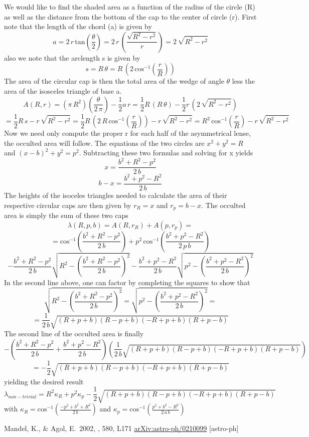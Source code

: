 \documentclass[12pt,preprint]{aastex}
\begin{document}
%

We would like to find the shaded area as a function of the radius of the circle (R)
as well as the distance from the bottom of the cap to the center of circle (r).
First note that the length of the chord (a) is given by
\[
a = 2 \, r \, \mathrm{tan} \left( \frac{\theta}{2} \right) = 2 \, r \,
\left( \frac{\sqrt{R^2 - r^2}}{r} \right) = 2 \, \sqrt{R^2 - r^2}
\]
also we note that the arclength s is given by
\[
s = R \, \theta = R \, \left( 2 \, \mathrm{cos}^{-1} \left( \frac{r}{R} \right) \right)
\]
The area of the circular cap is then the total area of the wedge of angle $\theta$
less the area of the isosceles triangle of base a.
\[
A(R,r) = (\pi \, R^2) \left( \frac{\theta}{2 \, \pi} \right) - \frac{1}{2} a \,
r = \frac{1}{2} R \, (R \, \theta) - \frac{1}{2} r \, ( 2 \, \sqrt{R^2 - r^2} )
\]
\[
 = \frac{1}{2} R \, s - r \, \sqrt{R^2 - r^2} = \frac{1}{2} R \, \left( 2 \, R
 \, \mathrm{cos}^{-1} \left( \frac{r}{R} \right) \right) - r \, \sqrt{R^2 - r^2}
 = R^2 \, \mathrm{cos}^{-1} \left( \frac{r}{R} \right) - r \, \sqrt{R^2 - r^2}
\]
Now we need only compute the proper r for each half of the asymmetrical lense,
the occulted area will follow. The equations of the two circles are $x^2 + y^2 = R$
and $(x-b)^2 + y^2 = p^2$.  Subtracting these two formulas and solving for x yields
\[
x = \frac{b^2 + R^2 - p^2}{2 \, b}
\]
\[
b - x = \frac{b^2 + p^2 - R^2}{2 \, b}
\]
The heights of the isoceles triangles needed to calculate the area of their respective
circular caps are then given by $r_R = x$ and $r_p = b-x$.  The occulted area is
simply the sum of these two caps
\[
\lambda(R,p,b) = A(R,r_R) + A(p,r_p) =
\]
\[
 = \mathrm{cos}^{-1} \left( \frac{b^2 + R^2 - p^2}{2 \, b } \right) + p^2
 \, \mathrm{cos}^{-1} \left( \frac{b^2 + p^2 - R^2}{2 \, p \, b} \right)
\]
\[
- \frac{b^2 + R^2 - p^2}{2 \, b} \sqrt{R^2 - \left( \frac{b^2 + R^2 - p^2}{2 \, b}
\right)^2 } - \frac{b^2 + p^2 -R^2}{2 \, b} \sqrt{ p^2 - \left( \frac{b^2 + p^2
- R^2}{2 \, b} \right)^2 }
\]
In the second line above, one can factor by completing the squares to show that
\[
\sqrt{R^2 - \left( \frac{b^2 + R^2 - p^2}{2 \, b} \right)^2 } =  \sqrt{ p^2 -
\left( \frac{b^2 + p^2 - R^2}{2 \, b} \right)^2 } =
\]
\[
 = \frac{1}{2 \, b} \sqrt{(R+p+b)(R-p+b)(-R+p+b)(R+p-b)}
\]
The second line of the occulted area is finally
\[
- \left( \frac{b^2 +R^2 - p^2}{2 \, b} + \frac{b^2 + p^2 - R^2}{2 \, b} \right)
\left( \frac{1}{2 \, b} \sqrt{(R+p+b)(R-p+b)(-R+p+b)(R+p-b)} \right)
\]
\[
 = - \frac{1}{2} \sqrt{(R+p+b)(R-p+b)(-R+p+b)(R+p-b)}
\]
yielding the desired result
\[
\lambda_{non-trivial} = R^2 \kappa_R + p^2 \kappa_p - \frac{1}{2} \sqrt{(R+p+b)(R-p+b)(-R+p+b)(R+p-b)}
\]
with $\kappa_R = \mathrm{cos}^{-1} \left( \frac{-p^2 + b^2 +R^2}{2 \, b} \right)$ and $\kappa_p = \mathrm{cos}^{-1} \left( \frac{p^2 + b^2 -R^2}{2 \, a \, b} \right)$
\newcommand{\arxiv}[1]{\href{http://arxiv.org/abs/#1}{arXiv:#1}}
\begin{thebibliography}{}\raggedright

        Mandel, K., \& Agol, E.\ 2002, \apjl, 580, L171
        \arxiv{astro-ph/0210099} [astro-ph]

\end{thebibliography}
\end{document}

